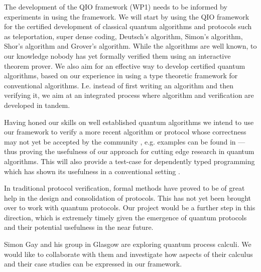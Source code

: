 \documentclass[a4paper]{article}
\begin{document}
The development of the QIO framework (WP1) needs to be informed by
experiments in using the framework. 
We will start by using the QIO framework for the
certified development of classical quantum algorithms and protocols
such as teleportation, super dense coding, Deutsch's algorithm,
Simon's algorithm, Shor's algorithm and Grover's algorithm. While the
algorithms are well known, to our knowledge nobody has yet formally
verified them using an interactive theorem prover. We also aim for an
effective way to develop certified quantum algorithms, based on our
experience in using a type theoretic framework for conventional
algorithms. I.e. instead of first writing an algorithm and then
verifying it, we aim at an integrated process where algorithm and
verification are developed in tandem.

Having honed our skills on well established quantum algorithms we
intend to use our framework to verify a more recent algorithm or
protocol whose correctness may not yet be accepted by the community ,
e.g.  examples can be found in  ---
thus proving the usefulness of our approach for cutting edge research
in quantum algorithms. This will also provide a test-case for
dependently typed programming which has shown its usefulness in a
conventional setting .

In traditional protocol verification, formal methods have proved to be
of great help in the design and  consolidation of protocols. This has
not yet been brought over to work with quantum protocols. Our project
would be a further step in this direction, which is extremely timely
given the emergence of quantum protocols and their potential
usefulness in the near future.

Simon Gay and his group in Glasgow are exploring quantum process
calculi. We would like to collaborate with them and investigate how
aspects of their calculus and their case studies can be expressed in
our framework.

\end{document}
